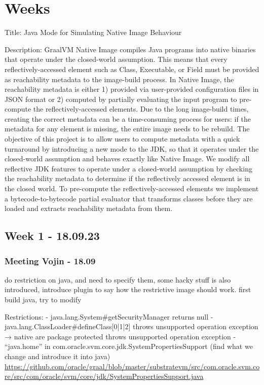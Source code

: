 \chapter{Weeks}
Title: Java Mode for Simulating Native Image Behaviour

Description: GraalVM Native Image compiles Java programs into native binaries that operate under the closed-world assumption. This means that every reflectively-accessed element such as Class, Executable, or Field must be provided as reachability metadata to the image-build process. In Native Image, the reachability metadata is either 1) provided via user-provided configuration files in JSON format or 2) computed by partially evaluating the input program to pre-compute the reflectively-accessed elements.
Due to the long image-build times, creating the correct metadata can be a time-consuming process for users: if the metadata for any element is missing, the entire image needs to be rebuild.
The objective of this project is to allow users to compute metadata with a quick turnaround by introducing a new mode to the JDK, so that it operates under the closed-world assumption and behaves exactly like Native Image.
We modify all reflective JDK features to operate under a closed-world assumption by checking the reachability metadata to determine if the reflectively accessed element is in the closed world. To pre-compute the reflectively-accessed elements we implement a bytecode-to-bytecode partial evaluator that transforms classes before they are loaded and extracts reachability metadata from them.
\section{Week 1 - 18.09.23}

\subsection{Meeting Vojin - 18.09}
do restriction on java, and need to specify them, some hacky stuff is also introduced, introduce plugin to say how the restrictive image should work.
first build java, try to modify

Restrictions:
- java.lang.System#getSecurityManager returns null
- java.lang.ClassLoader#defineClass[0|1|2] throws unsupported operation exception → native are package protected throws unsupported operation exception
- “java.home” in com.oracle.svm.core.jdk.SystemPropertiesSupport (find what we change and introduce it into java) \url{https://github.com/oracle/graal/blob/master/substratevm/src/com.oracle.svm.core/src/com/oracle/svm/core/jdk/SystemPropertiesSupport.java}

